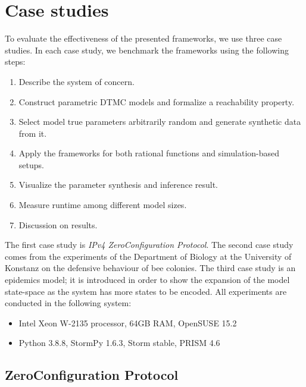 \chapter{Case studies}
To evaluate the effectiveness of the presented frameworks, we use three case studies. In each case
study, we benchmark the frameworks using the following steps:
\begin{enumerate}
    \item Describe the system of concern.
    \item Construct parametric DTMC models and formalize a reachability property.
    \item Select model true parameters arbitrarily random and generate synthetic data from it.
    \item Apply the frameworks for both rational functions and simulation-based setups.
    \item Visualize the parameter synthesis and inference result.
    \item Measure runtime among different model sizes.
    \item Discussion on results.
\end{enumerate}
The first case study is \textit{IPv4 ZeroConfiguration Protocol}. The second case study comes from
the experiments of the Department of Biology at the University of Konstanz on the defensive
behaviour of bee colonies\cite{hajnal2019data}. The third case study is an epidemics model; it is
introduced in order to show the expansion of the model state-space as the system has more states
to be encoded. All experiments are conducted in the following system:
\begin{itemize}
    \item Intel Xeon W-2135 processor, 64GB RAM, OpenSUSE 15.2
    \item Python 3.8.8, StormPy 1.6.3, Storm stable, PRISM 4.6
\end{itemize}


\section{ZeroConfiguration Protocol}
